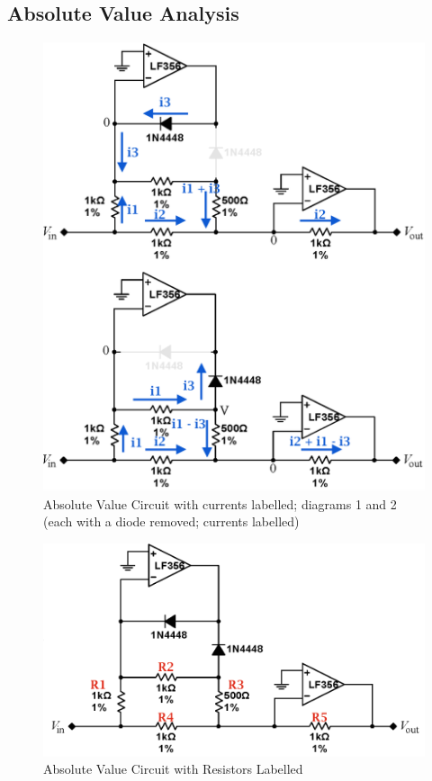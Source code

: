\documentclass{article}
\begin{document}
    \subsection{Absolute Value Analysis}
    \begin{figure}[H]
        \centering
        \includegraphics[scale = 0.6]{15.png}
        \caption{Absolute Value Circuit \cite{lab7} with currents labelled; diagrams 1 and 2 (each with a diode removed; currents labelled)}
        \label{fig:my_label}
    \end{figure}
    \begin{figure}[H]
        \centering
        \includegraphics[scale = 0.6]{15a.png}
        \caption{Absolute Value Circuit \cite{lab7} with Resistors Labelled}
        \label{fig:my_label}
    \end{figure}
\end{document}
